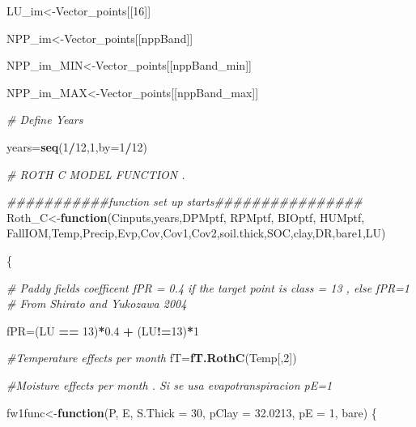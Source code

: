 \documentclass[
  10pt,
  b5paper,
]{book}
\newenvironment{Shaded}{\begin{snugshade}}{\end{snugshade}}
\newcommand{\CommentTok}[1]{\textcolor[rgb]{0.56,0.35,0.01}{\textit{#1}}}
\newcommand{\ControlFlowTok}[1]{\textcolor[rgb]{0.13,0.29,0.53}{\textbf{#1}}}
\newcommand{\DataTypeTok}[1]{\textcolor[rgb]{0.13,0.29,0.53}{#1}}
\newcommand{\DecValTok}[1]{\textcolor[rgb]{0.00,0.00,0.81}{#1}}
\newcommand{\FloatTok}[1]{\textcolor[rgb]{0.00,0.00,0.81}{#1}}
\newcommand{\KeywordTok}[1]{\textcolor[rgb]{0.13,0.29,0.53}{\textbf{#1}}}
\newcommand{\NormalTok}[1]{#1}
\newcommand{\OperatorTok}[1]{\textcolor[rgb]{0.81,0.36,0.00}{\textbf{#1}}}
\newcommand{\StringTok}[1]{\textcolor[rgb]{0.31,0.60,0.02}{#1}}
\begin{document}
\begin{Shaded}
\begin{Highlighting}[]
\NormalTok{LU_im<-Vector_points[[}\DecValTok{16}\NormalTok{]]}

\NormalTok{NPP_im<-Vector_points[[nppBand]]}

\NormalTok{NPP_im_MIN<-Vector_points[[nppBand_min]]}

\NormalTok{NPP_im_MAX<-Vector_points[[nppBand_max]]}

\CommentTok{# Define Years}

\NormalTok{years=}\KeywordTok{seq}\NormalTok{(}\DecValTok{1}\OperatorTok{/}\DecValTok{12}\NormalTok{,}\DecValTok{1}\NormalTok{,}\DataTypeTok{by=}\DecValTok{1}\OperatorTok{/}\DecValTok{12}\NormalTok{)}


\CommentTok{# ROTH C MODEL FUNCTION . }

\CommentTok{###########function set up starts################}
\NormalTok{Roth_C<-}\ControlFlowTok{function}\NormalTok{(Cinputs,years,DPMptf, RPMptf, BIOptf, HUMptf, FallIOM,Temp,Precip,Evp,Cov,Cov1,Cov2,soil.thick,SOC,clay,DR,bare1,LU)}

\NormalTok{\{}

\CommentTok{# Paddy fields coefficent fPR = 0.4 if the target point is class = 13 , else fPR=1}
\CommentTok{# From Shirato and Yukozawa 2004}

\NormalTok{fPR=(LU }\OperatorTok{==}\StringTok{ }\DecValTok{13}\NormalTok{)}\OperatorTok{*}\FloatTok{0.4} \OperatorTok{+}\StringTok{ }\NormalTok{(LU}\OperatorTok{!=}\DecValTok{13}\NormalTok{)}\OperatorTok{*}\DecValTok{1}

\CommentTok{#Temperature effects per month}
\NormalTok{fT=}\KeywordTok{fT.RothC}\NormalTok{(Temp[,}\DecValTok{2}\NormalTok{]) }

\CommentTok{#Moisture effects per month . Si se usa evapotranspiracion pE=1}

\NormalTok{fw1func<-}\ControlFlowTok{function}\NormalTok{(P, E, }\DataTypeTok{S.Thick =} \DecValTok{30}\NormalTok{, }\DataTypeTok{pClay =} \FloatTok{32.0213}\NormalTok{, }\DataTypeTok{pE =} \DecValTok{1}\NormalTok{, bare) }
\NormalTok{\{}
   

\end{Highlighting}
\end{Shaded}
\end{document}
